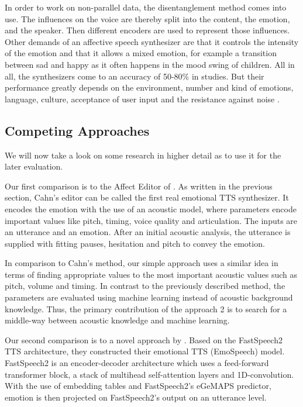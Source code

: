 \documentclass[11pt]{article}
\begin{document}
In order to work on non-parallel data, the disentanglement method comes into use. The influences on the voice are thereby split into the content, the emotion, and the speaker. Then different encoders are used to represent those influences.
Other demands of an affective speech synthesizer are that it controls the intensity of the emotion and that it allows a mixed emotion, for example a transition between sad and happy as it often happens in the mood swing of children. All in all, the synthesizers come to an accuracy of 50-80\% in studies. But their performance greatly depends on the environment, number and kind of emotions, language, culture, acceptance of user input and the resistance against noise \cite{triantafyllopoulos_overview_2023}.


\subsection{Competing Approaches}
\label{competing_approaches}
We will now take a look on some research in higher detail as to use it for the later evaluation. 

Our first comparison is to the Affect Editor of \cite{cahn_generation_2000}. As written in the previous section, Cahn's editor can be called the first real emotional TTS synthesizer. It encodes the emotion with the use of an acoustic model, where parameters encode important values like pitch, timing, voice quality and articulation. The inputs are an utterance and an emotion. After an initial acoustic analysis, the utterance is supplied with fitting pauses, hesitation and pitch to convey the emotion.

In comparison to Cahn's method, our simple approach uses a similar idea in terms of finding appropriate values to the most important acoustic values such as pitch, volume and timing. In contrast to the previously described method, the parameters are evaluated using machine learning instead of acoustic background knowledge. Thus, the primary contribution of the approach 2 is to search for a middle-way between acoustic knowledge and machine learning.

Our second comparison is to a novel approach by \cite{diatlova_emospeech_2023}. Based on the FastSpeech2 TTS architecture, they constructed their emotional TTS (EmoSpeech) model. FastSpeech2 is an encoder-decoder architecture which uses a feed-forward transformer block, a stack of multihead self-attention layers and 1D-convolution. With the use of embedding tables and FastSpeech2's eGeMAPS predictor, emotion is then projected on FastSpeech2's output on an utterance level.
\\
\end{document}

